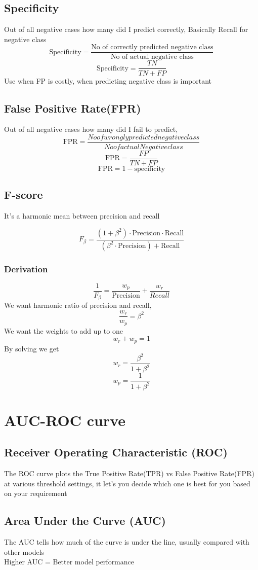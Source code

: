 \documentclass[12pt]{extarticle}
\begin{document}
\subsection{Specificity}
Out of all negative cases how many did I predict correctly, Basically Recall for negative class
$$ \text{Specificity} = \frac{\text{No of correctly predicted negative class}}{\text{No of actual negative class}}  $$
$$ \text{Specificity} = \frac{TN}{TN+FP}$$
Use when FP is costly, when predicting negative class is important

\subsection{False Positive Rate(FPR)}
Out of all negative cases how many did I fail to predict, 
$$ \text{FPR} = \frac{No of wrongly predicted negative class}{No of actual Negative class} $$
$$ \text{FPR} = \frac{FP}{TN+FP} $$
$$ \text{FPR} = 1 - \text{specificity}$$

\subsection{F-score}
It's a harmonic mean between precision and recall

$$F_\beta = \frac{(1 + \beta^2) \cdot \text{Precision} \cdot \text{Recall}}{(\beta^2 \cdot \text{Precision}) + \text{Recall}}$$
\subsubsection{Derivation} 
$$ \frac{1}{F_\beta} = \frac{w_p}{\text{Precision}} + \frac{w_r}{Recall} $$
We want harmonic ratio of precision and recall, 
$$ \frac{w_r}{w_p} = \beta^2$$
We want the weights to add up to one
$$ w_r + w_p = 1 $$
By solving we get
$$ w_r = \frac{\beta^2}{1 + \beta^2} $$ 
$$ w_p = \frac{1}{1 + \beta^2} $$

\section{AUC-ROC curve}
\subsection{Receiver Operating Characteristic (ROC)}
The ROC curve plots the True Positive Rate(TPR) vs False Positive Rate(FPR) at various threshold settings,
it let's you decide which one is best for you based on your requirement
\subsection{Area Under the Curve (AUC)}
The AUC tells how much of the curve is under the line,
usually compared with other models\\
Higher AUC = Better model performance \\
\end{document}
